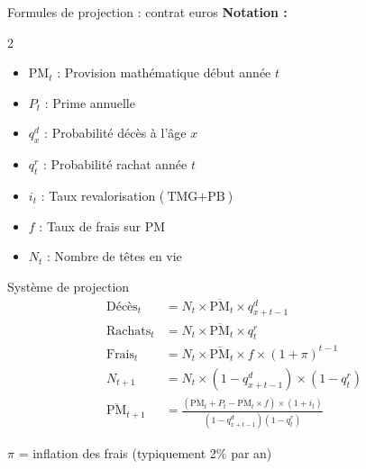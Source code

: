 \documentclass[10pt,aspectratio=169]{beamer}
\newcommand{\PM}{\text{PM}}
\newcommand{\TMG}{\text{TMG}}
\newcommand{\PB}{\text{PB}}
\begin{document}
\begin{frame}{Formules de projection : contrat euros}
\textbf{Notation :}
\begin{multicols}{2}
\begin{itemize}
    \item $\PM_t$ : Provision mathématique début année $t$
    \item $P_t$ : Prime annuelle
    \item $q_x^d$ : Probabilité décès à l'âge $x$
    \item $q_t^r$ : Probabilité rachat année $t$
    \item $i_t$ : Taux revalorisation ($\TMG + \PB$)
    \item $f$ : Taux de frais sur PM
    \item $N_t$ : Nombre de têtes en vie
\end{itemize}
\end{multicols}

\vspace{0.2cm}
\begin{block}{Système de projection}
\begin{align}
\text{Décès}_t &= N_t \times \overline{\PM}_t \times q_{x+t-1}^d \\
\text{Rachats}_t &= N_t \times \overline{\PM}_t \times q_t^r \\
\text{Frais}_t &= N_t \times \overline{\PM}_t \times f \times (1+\pi)^{t-1} \\
N_{t+1} &= N_t \times (1 - q_{x+t-1}^d) \times (1 - q_t^r) \\
\overline{\PM}_{t+1} &= \frac{(\overline{\PM}_t + P_t - \overline{\PM}_t \times f) \times (1+i_t)}{(1 - q_{x+t-1}^d)(1 - q_t^r)}
\end{align}
\end{block}

$\pi$ = inflation des frais (typiquement 2\% par an)
\end{frame}
\end{document}
